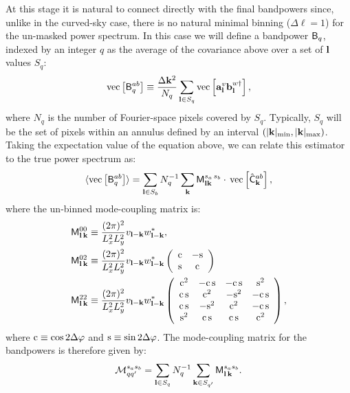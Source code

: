 \documentclass[usenatbib]{mnrasb}
\begin{document}
        At this stage it is natural to connect directly with the final bandpowers since, unlike in the curved-sky case, there is no natural minimal binning ($\Delta\ell=1$) for the un-masked power spectrum. In this case we will define a bandpower ${\sf B}_q$, indexed by an integer $q$ as the average of the covariance above over a set of ${\bf l}$ values $S_q$:
        \begin{equation}
          {\rm vec}\left[{\sf B}^{ab}_q\right]\equiv\frac{\Delta{\bf k}^2}{N_q}\sum_{{\bf l}\in S_q}{\rm vec}\left[{\bf a}^v_{\bf l}{\bf b}^{w\dag}_{\bf l}\right],
        \end{equation}
        where $N_q$ is the number of Fourier-space pixels covered by $S_q$. Typically, $S_q$ will be the set of pixels within an annulus defined by an interval $\left(|{\bf k}|_{\rm min},|{\bf k}|_{\rm max}\right)$.  Taking the expectation value of the equation above, we can relate this estimator to the true power spectrum as:
        \begin{equation}\label{eq:predflat}
          \langle{\rm vec}\left[{\sf B}^{ab}_q\right]\rangle=\sum_{{\bf l}\in S_b}N_q^{-1}\sum_{\bf k}{\sf M}^{s_a\,s_b}_{{\bf l}{\bf k}}\cdot\,{\rm vec}\left[\hat{\sf C}^{ab}_{\bf k}\right],
        \end{equation}
        where the un-binned mode-coupling matrix is:
        \begin{align}\label{eq:m00_flat}
          {\sf M}^{00}_{{\bf l}\,{\bf k}}&\equiv\frac{(2\pi)^2}{L_x^2L_y^2}v_{{\bf l}-{\bf k}}w^*_{{\bf l}-{\bf k}},\\\label{eq:m02_flat}
          {\sf M}^{02}_{{\bf l}\,{\bf k}}&\equiv\frac{(2\pi)^2}{L_x^2L_y^2}v_{{\bf l}-{\bf k}}w^*_{{\bf l}-{\bf k}}
          \left(
          \begin{array}{cc}
           {\rm c} & -{\rm s} \\
           {\rm s} &  {\rm c}
          \end{array}\right)\\\label{eq:m22_flat}
          {\sf M}^{22}_{{\bf l}\,{\bf k}}&\equiv\frac{(2\pi)^2}{L_x^2L_y^2}v_{{\bf l}-{\bf k}}w^*_{{\bf l}-{\bf k}}\left(
          \begin{array}{cccc}
           {\rm c}^2 & -{\rm c\,}{\rm s} & -{\rm c}\,{\rm s} & {\rm s}^2 \\
           {\rm c}\,{\rm s} & {\rm c}^2 & -{\rm s}^2 & -{\rm c}\,{\rm s} \\
           {\rm c}\,{\rm s} & -{\rm s}^2 & {\rm c}^2 & -{\rm c}\,{\rm s} \\
           {\rm s}^2 &  {\rm c}\,{\rm s} &  {\rm c}\,{\rm s} & {\rm c}^2
          \end{array}\right),
        \end{align}
        where $\rm{c} \equiv \cos2\Delta\varphi$ and $\rm{s}\equiv \sin2\Delta\varphi$. The mode-coupling matrix for the bandpowers is therefore given by:
        \begin{equation}\label{eq:modcoup_flat}
          \mathcal{M}^{s_as_b}_{qq'}=\sum_{{\bf l}\in S_q}N_q^{-1}\sum_{{\bf k}\in S_{q'}}{\sf M}^{s_as_b}_{{\bf l}\,{\bf k}}.
        \end{equation}
        
\end{document}
